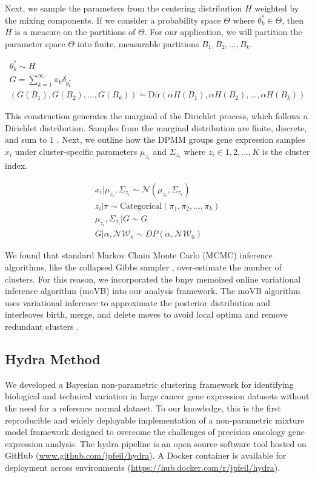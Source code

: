 \documentclass[10pt,letterpaper]{article}
\begin{document}
Next, we sample the parameters from the centering distribution $H$ weighted by the mixing components. If we consider a probability space $\Theta$ where $\theta_k^{*} \in \Theta$, then $H$ is a measure on the partitions of $\Theta$. For our application, we will partition the parameter space $\Theta$ into finite, measurable partitions $B_1, B_2, ..., B_k$. 

\begin{gather}
\theta_k^{*} \sim H \\
G = \sum_{k=1}^{\infty} \pi_k \delta_{\theta_k^{*}} \\
(G(B_1), G(B_2), ..., G(B_k)) \sim \text{Dir}(\alpha H(B_1), \alpha H(B_2), ..., \alpha H(B_k)) 
\end{gather}

This construction generates the marginal of the Dirichlet process, which follows a Dirichlet distribution. Samples from the marginal distribution are finite, discrete, and sum to $1$ \cite{fergusonBayesianAnalysisNonparametric1973}. Next, we outline how the DPMM groups gene expression samples $x_i$ under cluster-specific parameters $\mu_{z_i}$ and $\Sigma_{z_i}$ where $z_i \in {1, 2, ..., K}$ is the cluster index.

\begin{gather}
\label{eq:mm}
x_i | \mu_{z_i}, \Sigma_{z_i} \sim \mathcal{N}(\mu_{z_i}, \Sigma_{z_i}) \\
z_i | \pi \sim \text{Categorical}(\pi_1, \pi_2, ..., \pi_k) \\
\mu_{z_i}, \Sigma_{z_i} | G \sim G \\
G | \alpha, \mathcal{NW}_0 \sim DP(\alpha, \mathcal{NW}_0)
\end{gather}

We found that standard Markov Chain Monte Carlo (MCMC) inference algorithms, like the collapsed Gibbs sampler \cite{nealMarkovChainSampling2000, muller2004nonparametric}, over-estimate the number of clusters. For this reason, we incorporated the bnpy memoized online variational inference algorithm (moVB) \cite{hughes2013memoized} into our analysis framework. The moVB algorithm uses variational inference to approximate the posterior distribution and interleaves birth, merge, and delete moves to avoid local optima and remove redundant clusters \cite{hughesBnpyReliableScalable}. 

\subsection*{Hydra Method}
We developed a Bayesian non-parametric clustering framework for identifying biological and technical variation in large cancer gene expression datasets without the need for a reference normal dataset. To our knowledge, this is the first reproducible and widely deployable implementation of a non-parametric mixture model framework designed to overcome the challenges of precision oncology gene expression analysis. The hydra pipeline is an open source software tool hosted on GitHub (\url{www.github.com/jpfeil/hydra}). A Docker container is available for deployment across environments (\url{https://hub.docker.com/r/jpfeil/hydra}).
\end{document}
